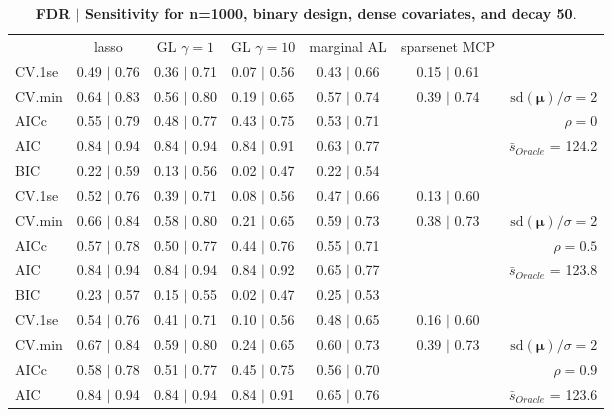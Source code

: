 \begin{table}\vspace{-.5cm}
\caption[l]{ {\it }
{ \bf FDR $\boldsymbol{\mid}$ Sensitivity for n=1000, binary design, dense covariates, and  decay  50}.}
\vspace{-.5cm}
\footnotesize{}
\begin{center}
\begin{tabular}{l*{5}{c}|r}
 & lasso & GL $\gamma=1$ & GL $\gamma=10$ & marginal AL & sparsenet MCP  & \\
 \cline{1-7}
CV.1se & 0.49 $\mid$ 0.76 & 0.36 $\mid$ 0.71 & 0.07 $\mid$ 0.56 & 0.43 $\mid$ 0.66 & 0.15 $\mid$ 0.61 & \\
CV.min & 0.64 $\mid$ 0.83 & 0.56 $\mid$ 0.80 & 0.19 $\mid$ 0.65 & 0.57 $\mid$ 0.74 & 0.39 $\mid$ 0.74 &  $\mathrm{sd}(\mathbf{\mu})/\sigma=2$ \\
AICc & 0.55 $\mid$ 0.79 & 0.48 $\mid$ 0.77 & 0.43 $\mid$ 0.75 & 0.53 $\mid$ 0.71 & & $\rho=0$ \\
AIC & 0.84 $\mid$ 0.94 & 0.84 $\mid$ 0.94 & 0.84 $\mid$ 0.91 & 0.63 $\mid$ 0.77 & &  \multirow{2}{*}{$\bar{s}_{Oracle}$ = 124.2} \\
BIC & 0.22 $\mid$ 0.59 & 0.13 $\mid$ 0.56 & 0.02 $\mid$ 0.47 & 0.22 $\mid$ 0.54 & &  \\
 \hline 
CV.1se & 0.52 $\mid$ 0.76 & 0.39 $\mid$ 0.71 & 0.08 $\mid$ 0.56 & 0.47 $\mid$ 0.66 & 0.13 $\mid$ 0.60 & \\
CV.min & 0.66 $\mid$ 0.84 & 0.58 $\mid$ 0.80 & 0.21 $\mid$ 0.65 & 0.59 $\mid$ 0.73 & 0.38 $\mid$ 0.73 &  $\mathrm{sd}(\mathbf{\mu})/\sigma=2$ \\
AICc & 0.57 $\mid$ 0.78 & 0.50 $\mid$ 0.77 & 0.44 $\mid$ 0.76 & 0.55 $\mid$ 0.71 & & $\rho=0.5$ \\
AIC & 0.84 $\mid$ 0.94 & 0.84 $\mid$ 0.94 & 0.84 $\mid$ 0.92 & 0.65 $\mid$ 0.77 & &  \multirow{2}{*}{$\bar{s}_{Oracle}$ = 123.8} \\
BIC & 0.23 $\mid$ 0.57 & 0.15 $\mid$ 0.55 & 0.02 $\mid$ 0.47 & 0.25 $\mid$ 0.53 & &  \\
 \hline 
CV.1se & 0.54 $\mid$ 0.76 & 0.41 $\mid$ 0.71 & 0.10 $\mid$ 0.56 & 0.48 $\mid$ 0.65 & 0.16 $\mid$ 0.60 & \\
CV.min & 0.67 $\mid$ 0.84 & 0.59 $\mid$ 0.80 & 0.24 $\mid$ 0.65 & 0.60 $\mid$ 0.73 & 0.39 $\mid$ 0.73 &  $\mathrm{sd}(\mathbf{\mu})/\sigma=2$ \\
AICc & 0.58 $\mid$ 0.78 & 0.51 $\mid$ 0.77 & 0.45 $\mid$ 0.75 & 0.56 $\mid$ 0.70 & & $\rho=0.9$ \\
AIC & 0.84 $\mid$ 0.94 & 0.84 $\mid$ 0.94 & 0.84 $\mid$ 0.91 & 0.65 $\mid$ 0.76 & &  \multirow{2}{*}{$\bar{s}_{Oracle}$ = 123.6} \\

\end{tabular}
\end{center}
\end{table}
